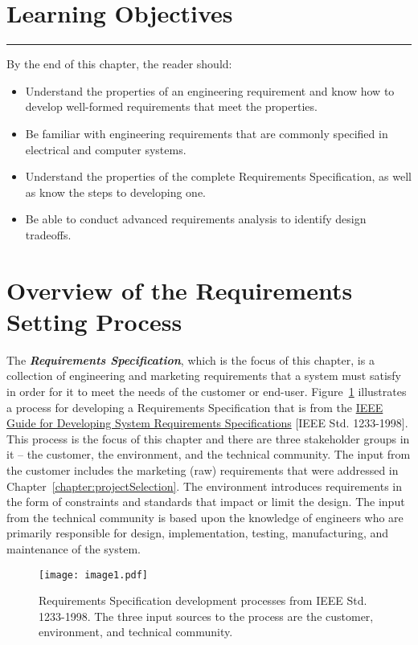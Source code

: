 \section*{Learning Objectives}
\noindent\rule{\linewidth}{1pt}
By the end of this chapter, the reader should:

\begin{itemize}
\item
  Understand the properties of an engineering requirement and know how
  to develop well-formed requirements that meet the properties.
\item
  Be familiar with engineering requirements that are commonly specified
  in electrical and computer systems.
\item
  Understand the properties of the complete Requirements Specification,
  as well as know the steps to developing one.
\item
  Be able to conduct advanced requirements analysis to identify design
  tradeoffs.
\end{itemize}

\section{Overview of the Requirements Setting Process}
\label{section':overview-of-the-requirements-setting-process}

The \emph{\textbf{Requirements Specification}}, which is the focus of
this chapter, is a collection of engineering and marketing requirements
that a system must satisfy in order for it to meet the needs of the
customer or end-user. Figure~\ref{figure: ieeeRequirements} 
illustrates a process for developing a
Requirements Specification that is from the \ul{IEEE Guide for
Developing System Requirements Specifications} {[}IEEE Std.
1233-1998{]}. This process is the focus of this chapter and there are
three stakeholder groups in it -- the customer, the environment, and the
technical community. The input from the customer includes the marketing
(raw) requirements that were addressed in 
Chapter~\ref{chapter:projectSelection}. The environment
introduces requirements in the form of constraints and standards that
impact or limit the design. The input from the technical community is
based upon the knowledge of engineers who are primarily responsible for
design, implementation, testing, manufacturing, and maintenance of the
system.

\begin{figure}[h]
\texttt{[image: image1.pdf]}
\caption{Requirements Specification development processes
from IEEE Std. 1233-1998. The three input sources to the process are the
customer, environment, and technical community.}
\label{figure: ieeeRequirements}
\end{figure}

